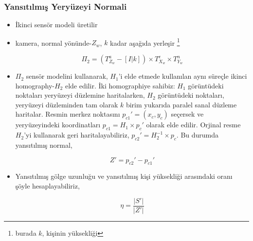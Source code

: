 \documentclass{beamer}
\begin{document}
\begin{frame}[allowframebreaks]
	\frametitle{Yansıtılmış Yeryüzeyi Normali}

	\begin{itemize}
		\item İkinci sensör modeli üretilir
		\item kamera, normal yönünde-$Z_w$, $k$ kadar aşağıda yerleşir
			\footnote{burada $k$, kişinin yüksekliği}

			\begin{equation}
				\Pi_2 = (T^a_{Z_w} - [I|k]) \times T^e_{X_w} \times T^n_{Y_w}
					\label{eq:ikinci-sensor-matrisi}
			\end{equation}

		\item $\Pi_2$ sensör modelini kullanarak, $H_1$'i elde etmede kullanılan
		aynı süreçle ikinci homography-$H_2$ elde edilir. İki homographiye
		sahibiz: $H_1$ görüntüdeki noktaları yeryüzeyi düzlemine haritalarken,
		$H_2$ görüntüdeki noktaları, yeryüzeyi düzleminden tam olarak $k$ birim
		yukarıda paralel sanal düzleme haritalar. Resmin merkez noktasını
		$p_{c1}' = (x_c, y_c)$ seçersek ve yeryüzeyindeki koordinatları
		$p_{c1} = H_1 \times p_c'$ olarak elde edilir. Orjinal resme $H_2$'yi
		kullanarak geri haritalayabiliriz, $p_{c2}' = H_2^{-1} \times p_c$.
		Bu durumda yansıtılmış normal,

			\begin{equation}
				Z' = p_{c2}' - p_{c1}'
				\label{eq:yansitilmis-normal}
			\end{equation}

		\item Yansıtılmış gölge uzunluğu ve yansıtılmış kişi yüksekliği
		arasındaki oranı şöyle hesaplayabiliriz,

			\begin{equation}
				\eta = \frac{|S'|}{|Z'|}
				\label{eq:yansitilmis-golge-yukseklik-orani}
			\end{equation}
	\end{itemize}
\end{frame}
\end{document}
